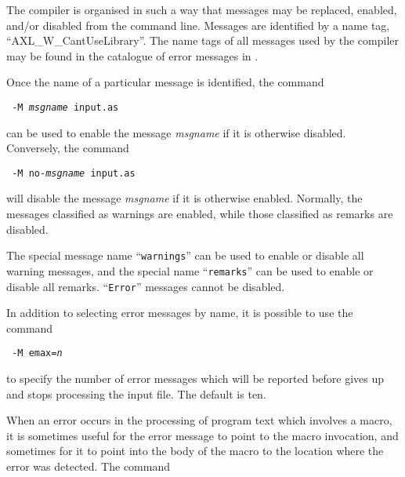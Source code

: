 \clearpage

The \asharp{} compiler is organised in such a way that messages may
be replaced, enabled, and/or disabled from the command line.
Messages are identified by a name tag, \eg{} ``AXL\_W\_CantUseLibrary''.
The name tags of all messages used by
the compiler may be found in the catalogue of error messages in
.

Once the name of a particular message is identified, the command

{\small
{\tt \asharpcmd{} -M {\it msgname} input.as}
}

can be used to enable
the message {\it msgname} if it is otherwise disabled.  Conversely, the
command 

{\small
{\tt \asharpcmd{} -M no-{\it msgname} input.as}
}

will disable the message {\it msgname} if it is otherwise enabled.
Normally, the messages classified as warnings are enabled,
while those classified as remarks are disabled.

The special message name ``\verb+warnings+'' can be used to enable or
disable all warning messages, and the special name ``\verb+remarks+'' can
be used to enable or disable all remarks.
``\verb"Error"'' messages cannot be disabled.

In addition to selecting error messages by name, it is possible to use
the command

{\small
{\tt \asharpcmd{} -M emax={\it n}}
}

to specify the number
of error messages which will be reported before \asharpcmd{} gives up and
stops processing the input file.  The default is ten.


When an error occurs in the processing of program text which involves
a macro, it is sometimes useful for the error message to point to the
macro invocation, and sometimes for it to
point into the body of the macro to the location where the error was
detected.  The command 

